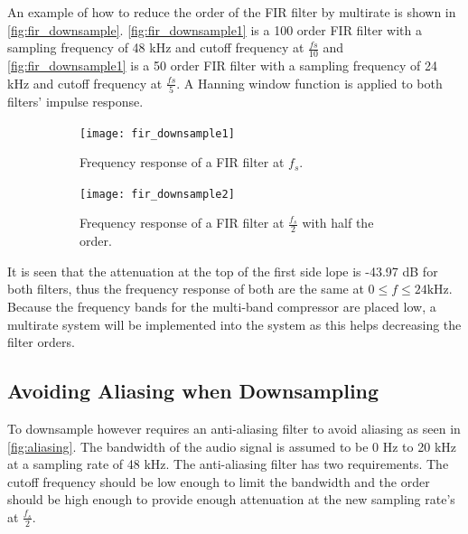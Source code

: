 An example of how to reduce the order of the FIR filter by multirate is shown in \autoref{fig:fir_downsample}. \autoref{fig:fir_downsample1} is a 100 order FIR filter with a sampling frequency of 48 kHz and cutoff frequency at $\frac{fs}{10}$ and \autoref{fig:fir_downsample1} is a 50 order FIR filter with a sampling frequency of 24 kHz and cutoff frequency at $\frac{fs}{5}$. A Hanning window function is applied to both filters' impulse response. 

\begin{figure}[H]
\centering
\begin{subfigure}[t]{0.44\textwidth}
\texttt{[image: fir\_downsample1]}
	\caption{Frequency response of a FIR filter at $f_s$.}
	\label{fig:fir_downsample1}
\end{subfigure}
\hspace{6mm} 
\begin{subfigure}[t]{0.47\textwidth}
\texttt{[image: fir\_downsample2]}
	\caption{Frequency response of a FIR filter at $\frac{f_s}{2}$ with half the order.}
	\label{fig:fir_downsample2}
\end{subfigure}
\caption{}
\label{fig:fir_downsample}
\end{figure}

It is seen that the attenuation at the top of the first side lope is -43.97 dB for both filters, thus the frequency response of both are the same at $0 \leq f \leq 24 \text{kHz}$. Because the frequency bands for the multi-band compressor are placed low, a multirate system will be implemented into the system as this helps decreasing the filter orders.

\subsection*{Avoiding Aliasing when Downsampling}
To downsample however requires an anti-aliasing filter to avoid aliasing as seen in \autoref{fig:aliasing}. The bandwidth of the audio signal is assumed to be 0 Hz to 20 kHz at a sampling rate of 48 kHz. The anti-aliasing filter has two requirements. The  cutoff frequency should be low enough to limit the bandwidth and the order should be high enough to provide enough attenuation at the new sampling rate's at $\frac{f_s}{2}$. 

